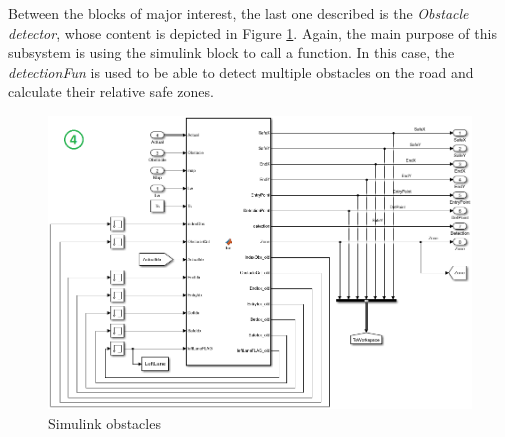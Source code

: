 Between the blocks of major interest, the last one described is the \textit{Obstacle detector}, whose content is depicted in Figure \ref{fig:simulink_obstacles}. Again, the main purpose of this subsystem is using the simulink block to call a function. In this case, the \textit{detectionFun} is used to be able to detect multiple obstacles on the road and calculate their relative safe zones.

\begin{figure}[H]
    \centering
    \includegraphics[width=\textwidth]{Figures/simulink_obstacles.png}
    \caption{Simulink obstacles}
    \label{fig:simulink_obstacles}
\end{figure} 



